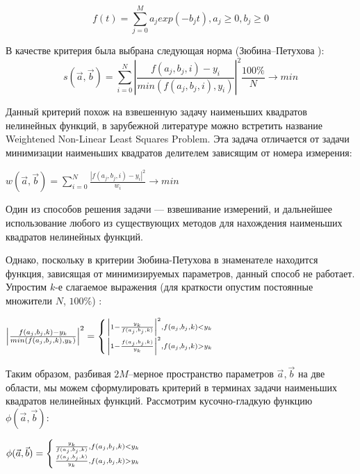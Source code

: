 \begin{equation}
  \label{eq:approximation}
  \mathit{ f(t)  = \displaystyle\sum_{j=0}^M a_j exp(-b_j t) , a_j \geq 0 , b_j \geq 0  }  
\end{equation}




В качестве критерия была выбрана следующая норма (Зюбина--Петухова ): 
\begin{equation}
	\label{eq:zuybin_petuhov}
	s(\vec{a}, \vec{b}) = \displaystyle\sum_{i=0}^N \left|
	\frac{f(a_j, b_j, i) - y_i}{min(f(a_j, b_j, i), y_i)}\right|^2 
	\frac{100\%}{N} \rightarrow min %
\end{equation}

Данный критерий похож на взвешенную задачу наименьших квадратов 
нелинейных функций, в зарубежной литературе можно встретить название 
Weightened Non-Linear Least Squares Problem. Эта задача отличается
от задачи минимизации наименьших квадратов делителем зависящим от номера измерения: 
\begin{center}
$w(\vec{a}, \vec{b}) = \displaystyle\sum_{i=0}^N \frac{\left|f(a_j, b_j, i) - y_i\right|^2}{w_i} \rightarrow min$
\end{center}
Один из способов решения задачи --- взвешивание измерений, и  дальнейшее использование любого из существующих методов для нахождения 
наименьших квадратов нелинейных функций.


Однако, поскольку в критерии Зюбина-Петухова в знаменателе 
находится функция, зависящая от минимизируемых параметров, 
данный способ не работает. Упростим $k$-е слагаемое выражения %
(для краткости опустим постоянные множители $N$, $100\%$) : 

\begin{center}
 \large{$ \left|\frac{f(a_j, b_j, k) - y_k}{min(f(a_j, b_j, k), y_k)}\right|^2 = \left\{ {
    \left| 1 - \frac{y_k}{f(a_j, b_j, k)}\right|^2 , f(a_j, b_j, k) < y_k  \atop 
    \left| 1 - \frac{f(a_j, b_j, k)}{y_k}\right|^2 , f(a_j, b_j, k) > y_k  
 } \right. $}
\end{center}

Таким образом, разбивая $ 2 M $--мерное пространство параметров $ \vec{a}, \vec{b}$ на две области, мы можем сформулировать 
критерий в терминах задачи наименьших квадратов нелинейных функций.
Рассмотрим кусочно-гладкую функцию $\phi(\vec{a}, \vec{b})$: 
\begin{center}
$ \phi(\vec{a}, \vec{b}) = \left\{ {
    \frac{y_k}{f(a_j, b_j, k)} , f(a_j, b_j, k) < y_k  \atop 
    \frac{f(a_j, b_j, k)}{y_k} , f(a_j, b_j, k) > y_k  
 } \right.$
\end{center}

